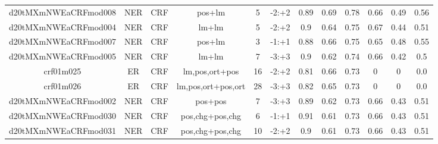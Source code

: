 \documentclass[a4paper]{article}
\begin{document}
\begin{landscape}
\begin{center}
\begin{tabular}{ |c|c|c|c|c|c|c|c|c|c|c|c|}
 	
 
 	
 		
 		\small{ d20tMXmNWEaCRFmod008 } & NER & CRF & pos+lm  &  5 &  -2:+2  &  0.89 & 0.69 & 0.78  &  0.66 & 0.49 & 0.56 \\
 		

 	
 
 	
 		
 		\small{ d20tMXmNWEaCRFmod004 } & NER & CRF & lm+lm  &  5 &  -2:+2  &  0.9 & 0.64 & 0.75  &  0.67 & 0.44 & 0.51 \\
 		

 	
 
 	
 		
 		\small{ d20tMXmNWEaCRFmod007 } & NER & CRF & pos+lm  &  3 &  -1:+1  &  0.88 & 0.66 & 0.75  &  0.65 & 0.48 & 0.55 \\
 		

 	
 
 	
 		
 		\small{ d20tMXmNWEaCRFmod005 } & NER & CRF & lm+lm  &  7 &  -3:+3  &  0.9 & 0.62 & 0.74  &  0.66 & 0.42 & 0.5 \\
 		

 	
 
 	
 		
 		\small{ crf01m025 } & ER & CRF & lm,pos,ort+pos  &  16 &  -2:+2  &  0.81 & 0.66 & 0.73  &  0 & 0 & 0.0 \\
 		

 	
 
 	
 		
 		\small{ crf01m026 } & ER & CRF & lm,pos,ort+pos,ort  &  28 &  -3:+3  &  0.82 & 0.65 & 0.73  &  0 & 0 & 0.0 \\
 		

 	
 
 	
 		
 		\small{ d20tMXmNWEaCRFmod002 } & NER & CRF & pos+pos  &  7 &  -3:+3  &  0.89 & 0.62 & 0.73  &  0.66 & 0.43 & 0.51 \\
 		

 	
 
 	
 		
 		\small{ d20tMXmNWEaCRFmod030 } & NER & CRF & pos,chg+pos,chg  &  6 &  -1:+1  &  0.91 & 0.61 & 0.73  &  0.66 & 0.43 & 0.51 \\
 		

 	
 
 	
 		
 		\small{ d20tMXmNWEaCRFmod031 } & NER & CRF & pos,chg+pos,chg  &  10 &  -2:+2  &  0.9 & 0.61 & 0.73  &  0.66 & 0.43 & 0.51 \\
 		


\end{tabular}
\end{center}
\end{landscape}
\end{document}
